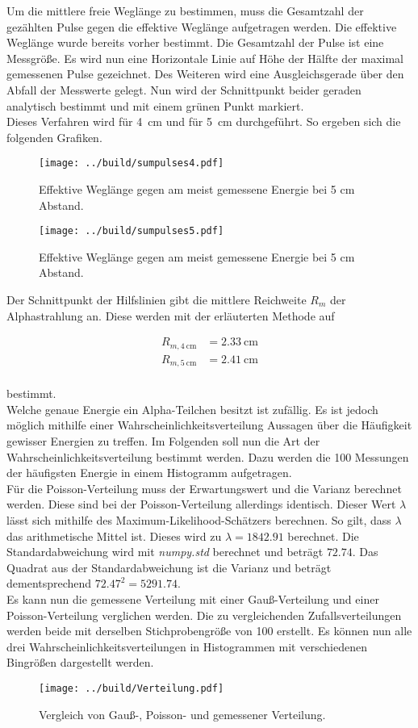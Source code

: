 \noindent Um die mittlere freie Weglänge zu bestimmen, muss die Gesamtzahl der gezählten Pulse gegen die effektive Weglänge aufgetragen werden. 
Die effektive Weglänge wurde bereits vorher bestimmt. Die Gesamtzahl der Pulse ist eine Messgröße. 
Es wird nun eine Horizontale Linie auf Höhe der Hälfte der maximal gemessenen Pulse gezeichnet. Des Weiteren wird eine Ausgleichsgerade über 
den Abfall der Messwerte gelegt. Nun wird der Schnittpunkt beider geraden analytisch bestimmt und mit einem grünen Punkt markiert.\\
\noindent Dieses Verfahren wird für \qty{4}{\centi \meter} und für \qty{5}{\centi \meter} durchgeführt. So ergeben sich die folgenden Grafiken.

\begin{figure}[H] 
    \texttt{[image: ../build/sumpulses4.pdf]}
    \caption{Effektive Weglänge gegen am meist gemessene Energie bei 5 cm Abstand.}
\end{figure}

\begin{figure}[H] 
    \texttt{[image: ../build/sumpulses5.pdf]}
    \caption{Effektive Weglänge gegen am meist gemessene Energie bei 5 cm Abstand.}
\end{figure}

\noindent Der Schnittpunkt der Hilfslinien gibt die mittlere Reichweite $R_m$ der 
Alphastrahlung an. Diese werden mit der erläuterten Methode auf 

\begin{align}
    R_{m, \qty{4}{\centi \meter}} &= \qty{2.33}{\centi \meter} \\
    R_{m, \qty{5}{\centi \meter}} &= \qty{2.41}{\centi \meter} \\
\end{align}

\noindent bestimmt.\\

\noindent Welche genaue Energie ein Alpha-Teilchen besitzt ist zufällig. Es ist jedoch möglich mithilfe einer 
Wahrscheinlichkeitsverteilung Aussagen über die Häufigkeit gewisser Energien zu treffen. Im Folgenden soll nun die Art 
der Wahrscheinlichkeitsverteilung bestimmt werden. Dazu werden die 100 Messungen der häufigsten Energie in einem 
Histogramm aufgetragen. \\
\noindent Für die Poisson-Verteilung muss der Erwartungswert und die Varianz berechnet werden. Diese sind bei der 
Poisson-Verteilung allerdings identisch. Dieser Wert $\lambda$ lässt sich mithilfe des Maximum-Likelihood-Schätzers 
berechnen. So gilt, dass $\lambda$ das arithmetische Mittel ist. Dieses wird zu $\lambda = 1842.91$ berechnet.
Die Standardabweichung wird mit \emph{numpy.std} berechnet und beträgt $72.74$. Das Quadrat aus der Standardabweichung ist 
die Varianz und beträgt dementsprechend $72.47^2 = 5291.74$. \\
\noindent Es kann nun die gemessene Verteilung mit einer Gauß-Verteilung und einer Poisson-Verteilung verglichen werden. 
Die zu vergleichenden Zufallsverteilungen werden beide mit derselben Stichprobengröße von 100 erstellt. Es können nun 
alle drei Wahrscheinlichkeitsverteilungen in Histogrammen mit verschiedenen Bingrößen dargestellt werden.

\begin{figure}
    \texttt{[image: ../build/Verteilung.pdf]}
    \caption{Vergleich von Gauß-, Poisson- und gemessener Verteilung.}
\end{figure}


